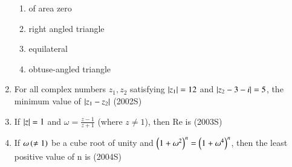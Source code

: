 \documentclass[journal,12pt,twocolumn]{IEEEtran}
\theoremstyle{remark}
\begin{document}
\begin{enumerate}[start=6]
\begin{enumerate}
\item of area zero
\item right angled triangle
\item equilateral
\item obtuse-angled triangle
\end{enumerate}
\item For all complex numbers $z_1,z_2$ satisfying $\left\vert z_1\right\vert=12$ and $\left\vert z_2-3-i\right\vert=5$, the minimum value of $\left\vert z_1-z_2\right\vert$
\hfill{(2002S)}
\begin{enumerate}
\end{enumerate}
\item If $\left\vert z\right\vert=1$ and $\omega=\frac{z-1}{z+1}$ (where $z\neq1$), then Re\brak{\omega} is
\hfill{(2003S)}
\begin{enumerate}
\end{enumerate}
\item If $\omega\left(\neq1\right)$ be a cube root of unity and $\left(1+\omega^2\right)^n = \left(1+\omega^4\right)^n$, then the least positive value of n is
\hfill{(2004S)}
\begin{enumerate}
\end{enumerate}
\end{enumerate}
\end{document}
